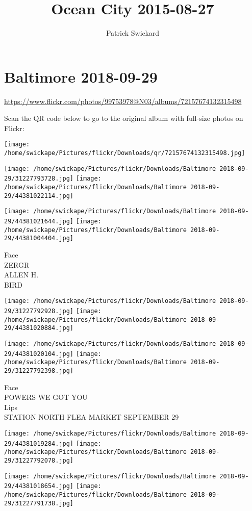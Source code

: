 \documentclass[10pt,letterpaper]{article}
\title{Ocean City 2015-08-27}
\author{Patrick Swickard}
\date{}
\begin{document}
\section*{Baltimore 2018-09-29}

\url{https://www.flickr.com/photos/99753978@N03/albums/72157674132315498}

Scan the QR code below to go to the original album with full-size photos on Flickr:

\texttt{[image: /home/swickape/Pictures/flickr/Downloads/qr/72157674132315498.jpg]}
\pagebreak

\texttt{[image: /home/swickape/Pictures/flickr/Downloads/Baltimore 2018-09-29/31227793728.jpg]}
\texttt{[image: /home/swickape/Pictures/flickr/Downloads/Baltimore 2018-09-29/44381022114.jpg]}

\texttt{[image: /home/swickape/Pictures/flickr/Downloads/Baltimore 2018-09-29/44381021644.jpg]}
\texttt{[image: /home/swickape/Pictures/flickr/Downloads/Baltimore 2018-09-29/44381004404.jpg]}

Face\\
ZERGR\\
ALLEN H.\\
BIRD
\pagebreak

\texttt{[image: /home/swickape/Pictures/flickr/Downloads/Baltimore 2018-09-29/31227792928.jpg]}
\texttt{[image: /home/swickape/Pictures/flickr/Downloads/Baltimore 2018-09-29/44381020884.jpg]}

\texttt{[image: /home/swickape/Pictures/flickr/Downloads/Baltimore 2018-09-29/44381020104.jpg]}
\texttt{[image: /home/swickape/Pictures/flickr/Downloads/Baltimore 2018-09-29/31227792398.jpg]}

Face\\
POWERS WE GOT YOU\\
Lips\\
STATION NORTH FLEA MARKET SEPTEMBER 29
\pagebreak

\texttt{[image: /home/swickape/Pictures/flickr/Downloads/Baltimore 2018-09-29/44381019284.jpg]}
\texttt{[image: /home/swickape/Pictures/flickr/Downloads/Baltimore 2018-09-29/31227792078.jpg]}

\texttt{[image: /home/swickape/Pictures/flickr/Downloads/Baltimore 2018-09-29/44381018654.jpg]}
\texttt{[image: /home/swickape/Pictures/flickr/Downloads/Baltimore 2018-09-29/31227791738.jpg]}
\end{document}
